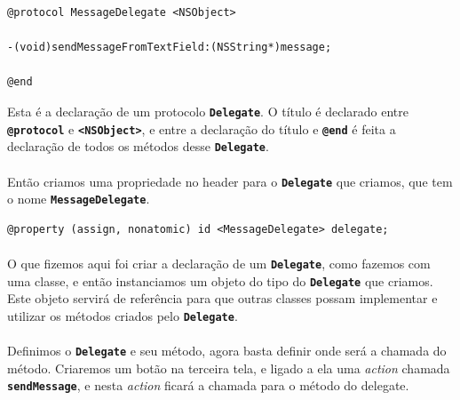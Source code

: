 \documentclass[a4paper,12pt,brazil,doubleside]{book}
\begin{document}
\begin{listing}
\begin{verbatim}
@protocol MessageDelegate <NSObject>

-(void)sendMessageFromTextField:(NSString*)message;

@end
\end{verbatim}
\end{listing}

Esta é a declaração de um protocolo \texttt{\textbf{Delegate}}. O título é declarado entre \texttt{\textbf{@protocol}} e \texttt{\textbf{<NSObject>}}, e entre a declaração do título e \texttt{\textbf{@end}} é feita a declaração de todos os métodos desse \texttt{\textbf{Delegate}}.

\paragraph{}Então criamos uma propriedade no header para o \texttt{\textbf{Delegate}} que criamos, que tem o nome \texttt{\textbf{MessageDelegate}}.

\begin{listing}
\begin{verbatim}
@property (assign, nonatomic) id <MessageDelegate> delegate;
\end{verbatim}
\end{listing}

\paragraph{}O que fizemos aqui foi criar a declaração de um \texttt{\textbf{Delegate}}, como fazemos com uma classe, e então instanciamos um objeto do tipo do \texttt{\textbf{Delegate}} que criamos. Este objeto servirá de referência para que outras classes possam implementar e utilizar os métodos criados pelo \texttt{\textbf{Delegate}}.

\paragraph{}Definimos o \texttt{\textbf{Delegate}} e seu método, agora basta definir onde será a chamada do método. Criaremos um botão na terceira tela, e ligado a ela uma \emph{action} chamada \texttt{\textbf{sendMessage}}, e nesta \emph{action} ficará a chamada para o método do delegate.
\end{document}
